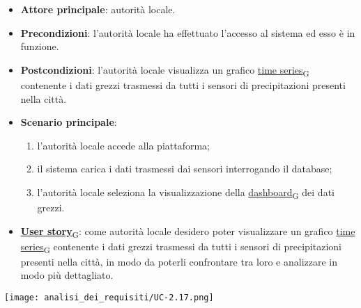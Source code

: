 \begin{itemize}
	\item \textbf{Attore principale}: autorità locale.
	\item \textbf{Precondizioni}: l'autorità locale ha effettuato l'accesso al sistema ed esso è in funzione.
	\item \textbf{Postcondizioni}: l'autorità locale visualizza un grafico \href{https://7last.github.io/docs/rtb/documentazione-interna/glossario\#time-series}{time series\textsubscript{G}} contenente i dati grezzi trasmessi da tutti i sensori
	      di precipitazioni presenti nella città.
	\item \textbf{Scenario principale}:
	      \begin{enumerate}
		      \item l'autorità locale accede alla piattaforma;
		      \item il sistema carica i dati trasmessi dai sensori interrogando il database;
		      \item l'autorità locale seleziona la visualizzazione della \href{https://7last.github.io/docs/rtb/documentazione-interna/glossario\#dashboard}{dashboard\textsubscript{G}} dei dati grezzi.
	      \end{enumerate}
	\item \href{https://7last.github.io/docs/rtb/documentazione-interna/glossario\#user-story}{\textbf{User story}\textsubscript{G}}:
	      come autorità locale desidero poter visualizzare un grafico \href{https://7last.github.io/docs/rtb/documentazione-interna/glossario\#time-series}{time series\textsubscript{G}} contenente i dati grezzi trasmessi da tutti i sensori
	      di precipitazioni presenti nella città, in modo da poterli confrontare tra loro e analizzare in modo più dettagliato.
\end{itemize}
\begin{center}
	\texttt{[image: analisi\_dei\_requisiti/UC-2.17.png]}
\end{center}

\newpage

